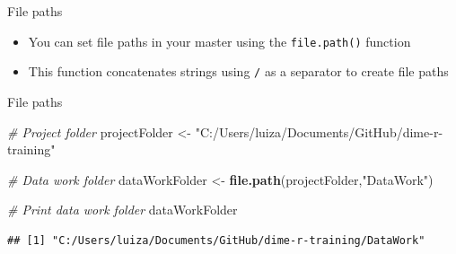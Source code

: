 \documentclass[ignorenonframetext,]{beamer}
\newenvironment{Shaded}{\begin{snugshade}}{\end{snugshade}}
\newcommand{\KeywordTok}[1]{\textcolor[rgb]{0.13,0.29,0.53}{\textbf{#1}}}
\newcommand{\StringTok}[1]{\textcolor[rgb]{0.31,0.60,0.02}{#1}}
\newcommand{\CommentTok}[1]{\textcolor[rgb]{0.56,0.35,0.01}{\textit{#1}}}
\newcommand{\NormalTok}[1]{#1}
\providecommand{\tightlist}{%
  \setlength{\itemsep}{0pt}\setlength{\parskip}{0pt}}
\begin{document}
\begin{frame}[fragile]{File paths}

\begin{itemize}
\tightlist
\item
  You can set file paths in your master using the \texttt{file.path()}
  function
\item
  This function concatenates strings using \texttt{/} as a separator to
  create file paths
\end{itemize}

\end{frame}

\begin{frame}[fragile]{File paths}

\begin{Shaded}
\begin{Highlighting}[]
  \CommentTok{# Project folder}
\NormalTok{  projectFolder  <-}\StringTok{ }
\StringTok{    "C:/Users/luiza/Documents/GitHub/dime-r-training"}

  \CommentTok{# Data work folder}
\NormalTok{  dataWorkFolder    <-}\StringTok{ }\KeywordTok{file.path}\NormalTok{(projectFolder,}\StringTok{"DataWork"}\NormalTok{)}

  \CommentTok{# Print data work folder}
\NormalTok{  dataWorkFolder}
\end{Highlighting}
\end{Shaded}

\begin{verbatim}
## [1] "C:/Users/luiza/Documents/GitHub/dime-r-training/DataWork"
\end{verbatim}

\end{frame}
\end{document}
